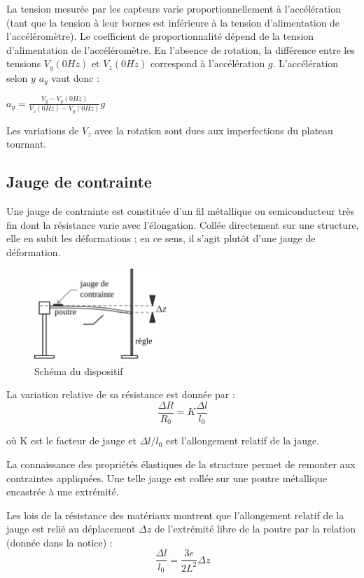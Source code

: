 \documentclass{article}%
\begin{document}
La tension mesurée par les capteurs varie proportionnellement à l'accélération (tant que la tension à leur bornes est inférieure à la tension d'alimentation de l'accéléromètre). Le coefficient de proportionnalité dépend de la tension d'alimentation de l'accéléromètre. En l'absence de rotation, la différence entre les tensions $V_y(0Hz)$ et $V_z(0Hz)$ correspond à l'accélération $g$. L'accélération selon $y$ $a_y$ vaut donc :

$a_y=\frac{V_y-V_y(0Hz)}{V_z(0Hz) -V_y(0Hz)}g$

Les variations de $V_z$ avec la rotation sont dues aux imperfections du plateau tournant. 

\subsection{Jauge de contrainte}

Une jauge de contrainte est constituée d'un fil métallique ou semiconducteur très fin dont la résistance varie avec l'élongation. Collée directement sur une structure, elle en subit les déformations ; en ce sens, il s'agit plutôt d'une jauge de déformation.
\begin{figure}
	\centerline{\includegraphics[width=5cm]{images-exp/JaugeContrainte.png}}
	\caption{Schéma du dispositif}
\end{figure}

La variation relative de sa résistance est donnée par :
\[ \frac{\Delta R}{R_0}= K \frac{\Delta l}{l_0}\]

où K est le facteur de jauge et $\Delta l/l_0$ est l'allongement relatif de la jauge.

La connaissance des propriétés élastiques de la structure permet de remonter aux contraintes appliquées. Une telle jauge est collée sur une poutre métallique encastrée à une extrémité.

Les lois de la résistance des matériaux montrent que l'allongement relatif de la jauge est relié au déplacement $ \Delta z$ de l'extrémité libre de la poutre par la relation (donnée dans la notice) :
\[ \frac{\Delta l}{l_0}= \frac{3e}{2 L^2}\Delta z \]
\end{document}
